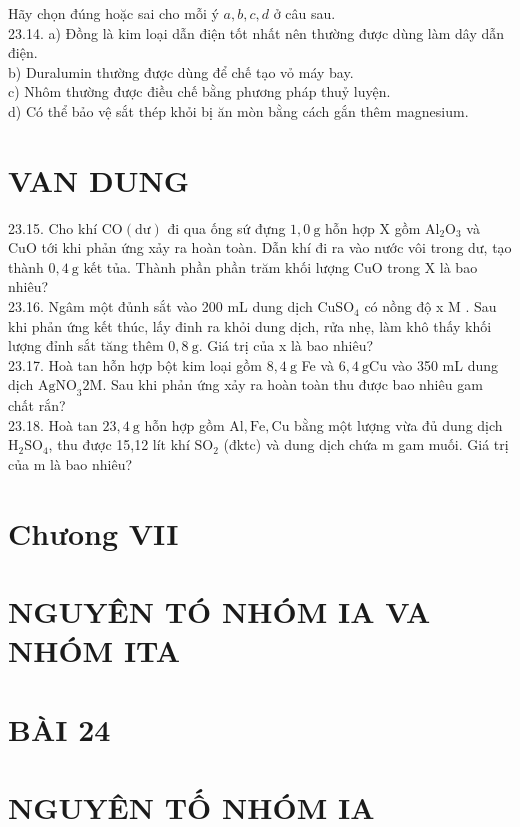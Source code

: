 \documentclass[10pt]{article}
\begin{document}
Hãy chọn đúng hoặc sai cho mỗi ý $a, b, c, d$ ở câu sau.\\
23.14. a) Đồng là kim loại dẫn điện tốt nhất nên thường được dùng làm dây dẫn điện.\\
b) Duralumin thường được dùng để chế tạo vỏ máy bay.\\
c) Nhôm thường được điều chế bằng phương pháp thuỷ luyện.\\
d) Có thể bảo vệ sắt thép khỏi bị ăn mòn bằng cách gắn thêm magnesium.

\section*{VAN DUNG}
23.15. Cho khí $\mathrm{CO}(\mathrm{dư})$ đi qua ống sứ đựng $1,0 \mathrm{~g}$ hỗn hợp X gồm $\mathrm{Al}_{2} \mathrm{O}_{3}$ và CuO tới khi phản ứng xảy ra hoàn toàn. Dẫn khí đi ra vào nước vôi trong dư, tạo thành $0,4 \mathrm{~g}$ kết tủa. Thành phần phần trăm khối lượng CuO trong X là bao nhiêu?\\
23.16. Ngâm một đủnh sắt vào 200 mL dung dịch $\mathrm{CuSO}_{4}$ có nồng độ x M . Sau khi phản ứng kết thúc, lấy đinh ra khỏi dung dịch, rửa nhẹ, làm khô thấy khối lượng đỉnh sắt tăng thêm $0,8 \mathrm{~g}$. Giá trị của x là bao nhiêu?\\
23.17. Hoà tan hỗn hợp bột kim loại gồm $8,4 \mathrm{~g}$ Fe và $6,4 \mathrm{~g} \mathrm{Cu}$ vào 350 mL dung dịch $\mathrm{AgNO}_{3} 2 \mathrm{M}$. Sau khi phản ứng xảy ra hoàn toàn thu được bao nhiêu gam chất rắn?\\
23.18. Hoà tan $23,4 \mathrm{~g}$ hỗn hợp gồm $\mathrm{Al}, \mathrm{Fe}, \mathrm{Cu}$ bằng một lượng vừa đủ dung dịch $\mathrm{H}_{2} \mathrm{SO}_{4}$, thu được 15,12 lít khí $\mathrm{SO}_{2}$ (đktc) và dung dịch chứa m gam muối. Giá trị của m là bao nhiêu?

\section*{Chưong VII}
\section*{NGUYÊN TÓ NHÓM IA VA NHÓM ITA}
\section*{BÀI 24}
\section*{NGUYÊN TỐ NHÓM IA}
\end{document}
